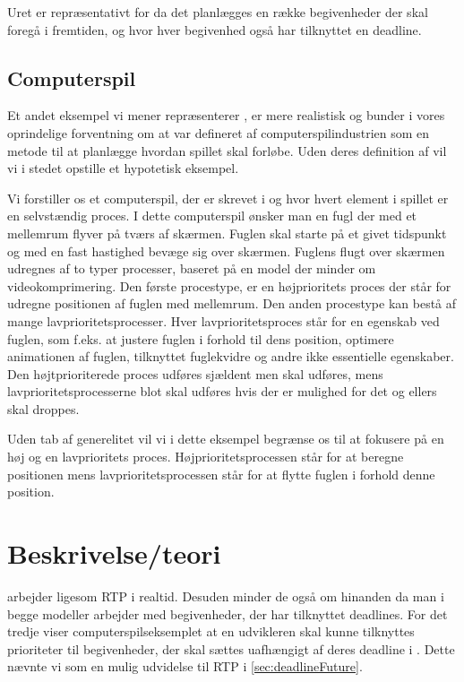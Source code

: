Uret er repræsentativt for \is da det planlægges en række begivenheder der skal foregå i fremtiden, og hvor hver begivenhed også har tilknyttet en deadline.

\subsection{Computerspil}
Et andet eksempel vi mener repræsenterer  \is, er mere realistisk og bunder i vores oprindelige forventning om at \is  var defineret af computerspilindustrien som en metode til at planlægge hvordan spillet skal forløbe. Uden deres definition af \is vil vi i stedet opstille et hypotetisk eksempel. 

Vi forstiller os et computerspil, der er skrevet i \pycsp og hvor hvert element i spillet er en selvstændig proces. I dette computerspil ønsker man en fugl der med et mellemrum flyver på tværs af skærmen. Fuglen skal starte på et givet tidspunkt og med en fast hastighed bevæge sig over skærmen. Fuglens flugt over skærmen udregnes af to typer processer, baseret på en model der minder om videokomprimering. Den første procestype, er en højprioritets proces der står for udregne positionen af fuglen med  mellemrum. Den anden procestype kan bestå af mange lavprioritetsprocesser. Hver lavprioritetsproces står for en egenskab ved fuglen, som  f.eks. at justere fuglen i forhold til dens position, optimere animationen af fuglen, tilknyttet fuglekvidre og andre ikke essentielle egenskaber.  Den højtprioriterede proces udføres sjældent men skal udføres, mens lavprioritetsprocesserne blot skal udføres hvis der er mulighed for det og ellers skal droppes.

Uden tab af generelitet vil vi i dette eksempel begrænse os til at fokusere på en høj og en lavprioritets proces. Højprioritetsprocessen står for at beregne positionen mens lavprioritetsprocessen står for at flytte fuglen i forhold denne position.

\section{Beskrivelse/teori}

\is arbejder ligesom RTP i realtid. Desuden minder de også om hinanden da man i begge modeller arbejder med begivenheder, der har tilknyttet deadlines. For det tredje viser computerspilseksemplet at en udvikleren skal kunne tilknyttes prioriteter til begivenheder, der skal sættes uafhængigt af deres deadline i \is. Dette nævnte vi som en mulig udvidelse til RTP i \cref{sec:deadlineFuture}.

